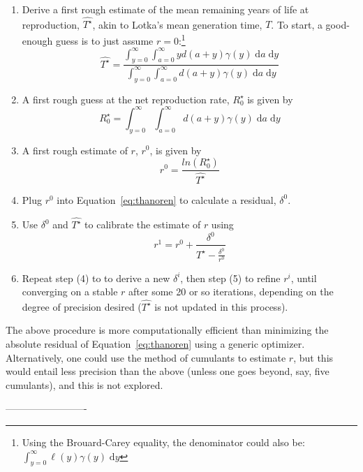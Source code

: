 \documentclass[12pt,oneside,a4paper,leqno]{article}
\newcommand{\dd}{\; \mathrm{d}}
\begin{document}
\begin{appendices}
\begin{enumerate}
  \item Derive a first rough estimate of the mean remaining years of life at
  reproduction, $\widehat{T^\star}$, akin to Lotka's mean generation time, $T$.
  To start, a good-enough guess is to just assume $r=0$:\footnote{Using the
  Brouard-Carey equality, the denominator could also be: $\int _{y=0}^\infty
  \ell(y) \gamma(y) \dd y$}
\begin{equation}
\widehat{T^\star} = \frac{\int _{y=0}^\infty \int _{a=0}^\infty y d (a+y)
\gamma(y) \dd a \dd y}{\int _{y=0}^\infty \int _{a=0}^\infty d(a+y) \gamma(y)
\dd a \dd y}
\end{equation}
  \item A first rough guess at the net reproduction rate, $R_0^\star$ is given
  by
 \begin{equation}
  R_0^\star = \int _{y=0}^\infty \int _{a=0}^\infty d(a+y) \gamma(y) \dd a
\dd y
\end{equation}
  \item A first rough estimate of $r$, $r^0$, is given by
   \begin{equation}
   r^0 = \frac{ln(R_0^\star)}{\widehat{T^\star}}
   \end{equation}
  \item Plug $r^0$ into Equation~\eqref{eq:thanoren} to calculate a
  residual, $\delta^0$.
  \item Use $\delta^0$ and $\widehat{T^\star}$ to calibrate the estimate of $r$
  using
  \begin{equation}
  r^{1} = r^0 + \frac{\delta^0}{\widehat{T^\star} - \frac{\delta^0}{r^0}}
  \end{equation}
  \item Repeat step (4) to to derive a new $\delta^i$, then step (5) to refine
  $r^i$, until converging on a stable $r$ after some 20 or so iterations,
  depending on the degree of precision desired ($\widehat{T^\star}$ is not updated
  in this process).
\end{enumerate}

The above procedure is more computationally efficient than minimizing the
absolute residual of Equation~\eqref{eq:thanoren} using a generic
optimizer. Alternatively, one could use the method of cumulants to estimate $r$,
but this would entail less precision than the above (unless one goes beyond,
say, five cumulants), and this is not explored.
 
 
\end{appendices}
\nocite{HMD,HFD}
-------------------------

    
\end{document}
